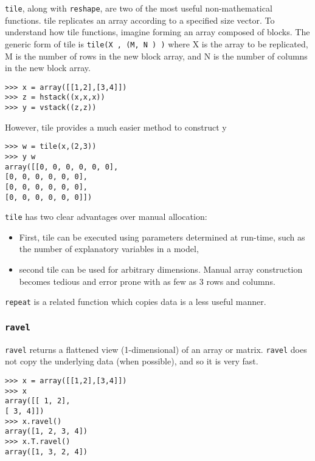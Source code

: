 \documentclass[Pydata.tex]{subfiles}
\begin{document}
\texttt{tile}, along with \texttt{reshape}, are two of the most useful non-mathematical functions. tile replicates an array
according to a specified size vector. To understand how tile functions, imagine forming an array composed
of blocks. The generic form of tile is \texttt{tile(X , (M, N ) )} where X is the array to be replicated, M is
the number of rows in the new block array, and N is the number of columns in the new block array. 
%
\begin{framed}
\begin{verbatim}
>>> x = array([[1,2],[3,4]])
>>> z = hstack((x,x,x))
>>> y = vstack((z,z))
\end{verbatim}
\end{framed}
However, tile provides a much easier method to construct y
\begin{framed}
\begin{verbatim}
>>> w = tile(x,(2,3))
>>> y w
array([[0, 0, 0, 0, 0, 0],
[0, 0, 0, 0, 0, 0],
[0, 0, 0, 0, 0, 0],
[0, 0, 0, 0, 0, 0]])
\end{verbatim}
\end{framed}
\texttt{tile} has two clear advantages over manual allocation: 
\begin{itemize} 
\item First, tile can be executed using parameters determined
at run-time, such as the number of explanatory variables in a model,
\item second tile can be
used for arbitrary dimensions. Manual array construction becomes tedious and error prone with as few
as 3 rows and columns. 
\end{itemize}
\texttt{repeat} is a related function which copies data is a less useful manner.

\subsubsection*{\texttt{ravel}}
\texttt{ravel} returns a flattened view (1-dimensional) of an array or matrix. \texttt{ravel} does not copy the underlying
data (when possible), and so it is very fast.
\begin{framed}
\begin{verbatim}
>>> x = array([[1,2],[3,4]])
>>> x
array([[ 1, 2],
[ 3, 4]])
>>> x.ravel()
array([1, 2, 3, 4])
>>> x.T.ravel()
array([1, 3, 2, 4])
\end{verbatim}
\end{framed}
\end{document}
